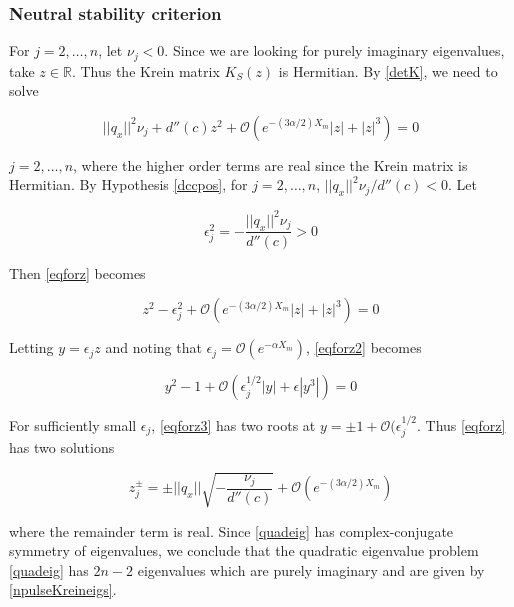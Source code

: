\documentclass[12pt]{article}
\def\R{{\mathbb R}}
\begin{document}
\subsubsection{Neutral stability criterion}

For $j = 2, \dots, n$, let $\nu_j < 0$. Since we are looking for purely imaginary eigenvalues, take $z \in \R$. Thus the Krein matrix $K_S(z)$ is Hermitian. By \eqref{detK}, we need to solve

\begin{equation}\label{eqforz}
||q_x||^2 \nu_j + d''(c) z^2 + \mathcal{O}(e^{-(3 \alpha/2) X_m}|z| + |z|^3) = 0
\end{equation}

$j = 2, \dots, n$, where the higher order terms are real since the Krein matrix is Hermitian. By Hypothesis \ref{dccpos}, for $j = 2, \dots, n$, $||q_x||^2 \nu_j / d''(c) < 0$. Let

\begin{equation}\label{epsilon2}
\epsilon_j^2 = -\frac{||q_x||^2 \nu_j}{d''(c)} > 0
\end{equation}

Then \eqref{eqforz} becomes

\begin{equation}\label{eqforz2}
z^2 - \epsilon_j^2 + \mathcal{O}(e^{-(3 \alpha/2) X_m}|z| + |z|^3) = 0
\end{equation}

Letting $y = \epsilon_j z$ and noting that $\epsilon_j = \mathcal{O}(e^{-\alpha X_m})$, \eqref{eqforz2} becomes

\begin{equation}\label{eqforz3}
y^2 - 1 + \mathcal{O}(\epsilon_j^{1/2 }|y| + \epsilon|y^3|) = 0
\end{equation}

For sufficiently small $\epsilon_j$, \eqref{eqforz3} has two roots at $y = \pm 1 + \mathcal{O}(\epsilon_j^{1/2}$. Thus \eqref{eqforz} has two solutions

\begin{equation}
z_j^\pm = \pm ||q_x|| \sqrt{ -\frac{ \nu_j}{d''(c)} } + \mathcal{O}(e^{-(3 \alpha/2) X_m})
\end{equation}

where the remainder term is real. Since \eqref{quadeig} has complex-conjugate symmetry of eigenvalues, we conclude that the quadratic eigenvalue problem \eqref{quadeig} has $2n - 2$ eigenvalues which are purely imaginary and are given by \eqref{npulseKreineigs}.
\end{document}

